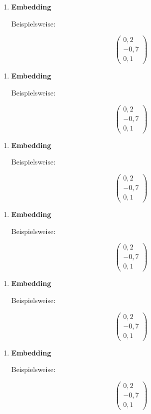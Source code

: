 \begin{enumerate}
\item \textbf{Embedding}

Beispielsweise:

\[
\begin{pmatrix}
0{,}2\\
-0{,}7\\
0{,}1
\end{pmatrix}
\]
\end{enumerate}
\begin{enumerate}
\item \textbf{Embedding}

Beispielsweise:

\[
\begin{pmatrix}
0{,}2\\
-0{,}7\\
0{,}1
\end{pmatrix}
\]
\end{enumerate}
\begin{enumerate}
\item \textbf{Embedding}

Beispielsweise:

\[
\begin{pmatrix}
0{,}2\\
-0{,}7\\
0{,}1
\end{pmatrix}
\]
\end{enumerate}
\begin{frame}[t]
\begin{enumerate}
\item \textbf{Embedding}

Beispielsweise:

\[
\begin{pmatrix}
0{,}2\\
-0{,}7\\
0{,}1
\end{pmatrix}
\]
\end{enumerate}
\end{frame}

\begin{frame}[t]
\begin{enumerate}
\item \textbf{Embedding}

Beispielsweise:

\[
\begin{pmatrix}
0{,}2\\
-0{,}7\\
0{,}1
\end{pmatrix}
\]
\end{enumerate}
\end{frame}

\begin{frame}[t]
\begin{enumerate}
\item \textbf{Embedding}

Beispielsweise:

\[
\begin{pmatrix}
0{,}2\\
-0{,}7\\
0{,}1
\end{pmatrix}
\]
\end{enumerate}
\end{frame}

